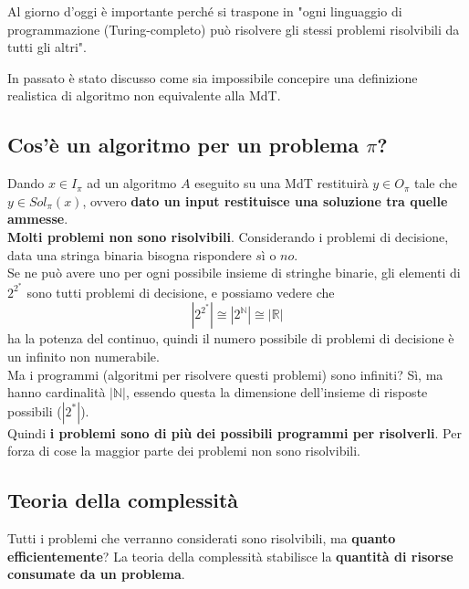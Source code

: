 \documentclass[11pt]{article}
\begin{document}
	Al giorno d'oggi è importante perché si traspone in "ogni linguaggio di programmazione (Turing-completo) può risolvere gli stessi problemi risolvibili da tutti gli altri". 
	
	In passato è stato discusso come sia impossibile concepire una definizione realistica di algoritmo non equivalente alla MdT.\\
	
	\newpage
	
	\subsection{Cos'è un algoritmo per un problema $\pi$?}
	
	Dando $x \in I_\pi$ ad un algoritmo $A$ eseguito su una MdT restituirà $y \in O_\pi$ tale che $y \in Sol_\pi (x)$, ovvero \textbf{dato un input restituisce una soluzione tra quelle ammesse}.\\
	
	\textbf{Molti problemi non sono risolvibili}. Considerando i problemi di decisione, data una stringa binaria bisogna rispondere $sì$ o $no$.\\
	
	Se ne può avere uno per ogni possibile insieme di stringhe binarie, gli elementi di $2^{2^\ast}$ sono tutti problemi di decisione, e possiamo vedere che
	$$ |2^{2^\ast}| \cong |2^{\mathbb{N}}| \cong |\mathbb{R}|$$
	ha la potenza del continuo, quindi il numero possibile di problemi di decisione è un infinito non numerabile. \\
	
	Ma i programmi (algoritmi per risolvere questi problemi) sono infiniti? Sì, ma hanno cardinalità $|\mathbb{N}|$, essendo questa la dimensione dell'insieme di risposte possibili ($|2^\ast|$).\\
	
	Quindi \textbf{i problemi sono di più dei possibili programmi per risolverli}. Per forza di cose la maggior parte dei problemi non sono risolvibili. \\
	
	\newpage
	
	\subsection{Teoria della complessità}
	Tutti i problemi che verranno considerati sono risolvibili, ma \textbf{quanto efficientemente}? La teoria della complessità stabilisce la \textbf{quantità di risorse consumate da un problema}.
	
\end{document}
